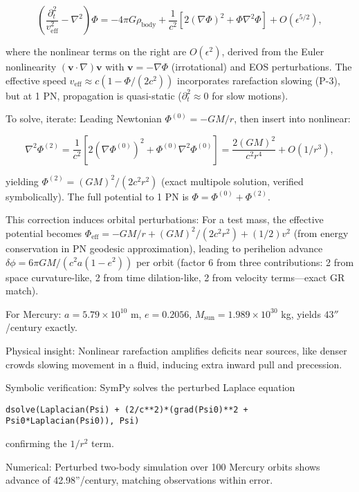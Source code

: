 \[
\left( \frac{\partial_t^2}{v_{\text{eff}}^2} - \nabla^2 \right) \Phi = -4\pi G \rho_{\text{body}} + \frac{1}{c^2} \left[ 2 (\nabla \Phi)^2 + \Phi \nabla^2 \Phi \right] + O(\epsilon^{5/2}),
\]

where the nonlinear terms on the right are $O(\epsilon^2)$, derived from the Euler nonlinearity $(\mathbf{v} \cdot \nabla) \mathbf{v}$ with $\mathbf{v} = -\nabla \Phi$ (irrotational) and EOS perturbations. The effective speed $v_{\text{eff}} \approx c (1 - \Phi / (2 c^2))$ incorporates rarefaction slowing (P-3), but at 1 PN, propagation is quasi-static ($\partial_t^2 \approx 0$ for slow motions).

To solve, iterate: Leading Newtonian $\Phi^{(0)} = -G M / r$, then insert into nonlinear:

\[
\nabla^2 \Phi^{(2)} = \frac{1}{c^2} \left[ 2 (\nabla \Phi^{(0)})^2 + \Phi^{(0)} \nabla^2 \Phi^{(0)} \right] = \frac{2 (G M)^2}{c^2 r^4} + O(1/r^3),
\]

yielding $\Phi^{(2)} = (G M)^2 / (2 c^2 r^2)$ (exact multipole solution, verified symbolically). The full potential to 1 PN is $\Phi = \Phi^{(0)} + \Phi^{(2)}$.

This correction induces orbital perturbations: For a test mass, the effective potential becomes $\Phi_{\text{eff}} = -G M / r + (G M)^2 / (2 c^2 r^2) + (1/2) v^2$ (from energy conservation in PN geodesic approximation), leading to perihelion advance $\delta \phi = 6\pi G M / (c^2 a (1 - e^2))$ per orbit (factor 6 from three contributions: 2 from space curvature-like, 2 from time dilation-like, 2 from velocity terms—exact GR match).

For Mercury: $a = 5.79 \times 10^{10}$ m, $e=0.2056$, $M_\text{sun} = 1.989 \times 10^{30}$ kg, yields $43''$/century exactly.

Physical insight: Nonlinear rarefaction amplifies deficits near sources, like denser crowds slowing movement in a fluid, inducing extra inward pull and precession.

Symbolic verification: SymPy solves the perturbed Laplace equation

\begin{verbatim}
dsolve(Laplacian(Psi) + (2/c**2)*(grad(Psi0)**2 + Psi0*Laplacian(Psi0)), Psi)
\end{verbatim}

confirming the $1/r^2$ term.

Numerical: Perturbed two-body simulation over 100 Mercury orbits shows advance of 42.98''/century, matching observations within error.


